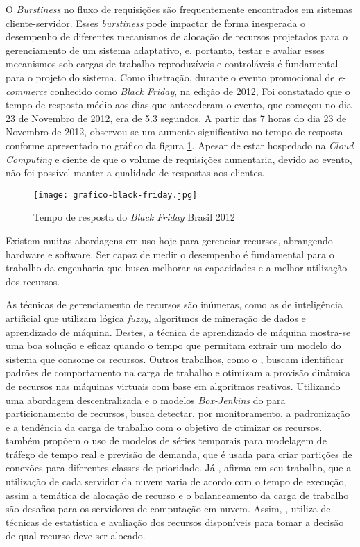 O \textit{Burstiness} no fluxo de requisições são frequentemente encontrados em sistemas cliente-servidor. Esses \textit{burstiness} pode impactar de forma inesperada o desempenho de diferentes mecanismos de alocação de recursos projetados para o gerenciamento de um sistema adaptativo, e, portanto, testar e avaliar esses mecanismos sob cargas de trabalho reproduzíveis e controláveis é fundamental para o projeto do sistema.  Como ilustração, durante o evento promocional de \textit{e-commerce} conhecido como \textit{Black Friday}, na edição de 2012, Foi constatado que o tempo de resposta médio aos dias que antecederam o evento, que começou no dia 23 de Novembro de 2012, era de 5.3 segundos. A partir das 7 horas do dia 23 de Novembro de 2012, observou-se um aumento significativo no tempo de resposta conforme apresentado no gráfico da figura \ref{fig:grafico-black-friday}. Apesar de estar hospedado na \textit{Cloud Computing} e ciente de que o volume de requisições aumentaria, devido ao evento, não foi possível manter a qualidade de respostas aos clientes.

\begin{figure}[htb]
	\caption{Tempo de resposta do \textit{Black Friday} Brasil 2012}
	\label{fig:grafico-black-friday}
	\centering
	\texttt{[image: grafico-black-friday.jpg]}
\end{figure}


Existem muitas abordagens em uso hoje para gerenciar recursos, abrangendo hardware e software. Ser capaz de medir o desempenho é fundamental para o trabalho da engenharia que busca melhorar as capacidades e a melhor utilização dos recursos.

As técnicas de gerenciamento de recursos são inúmeras, como as de inteligência artificial que utilizam lógica \textit{fuzzy}, algoritmos de mineração de dados e aprendizado de máquina. Destes, a técnica de aprendizado de máquina mostra-se uma boa solução e eficaz quando o tempo que permitam extrair um modelo do sistema que consome os recursos. Outros trabalhos, como o \cite{Zhang2007}, buscam identificar padrões de comportamento na carga de trabalho e otimizam a provisão dinâmica de recursos nas máquinas virtuais com base em algoritmos reativos. Utilizando uma abordagem descentralizada e o modelos \textit{Box-Jenkins} do \cite{box2011} para particionamento de recursos, \cite{Quiroz2009} busca detectar, por monitoramento, a padronização e a tendência da carga de trabalho com o objetivo de otimizar os recursos. \cite{Nobile2013} também propõem o uso de modelos de séries temporais para modelagem de tráfego de tempo real e previsão de demanda, que é usada para criar partições de conexões para diferentes classes de prioridade. Já \cite{Zhang2011}, afirma em seu trabalho, que a utilização de cada servidor da nuvem varia de acordo com o tempo de execução, assim a temática de alocação de recurso e o balanceamento da carga de trabalho são desafios para os servidores de computação em nuvem. Assim, \cite{Zhang2011}, utiliza de técnicas de estatística e avaliação dos recursos disponíveis para tomar a decisão de qual recurso deve ser alocado.

